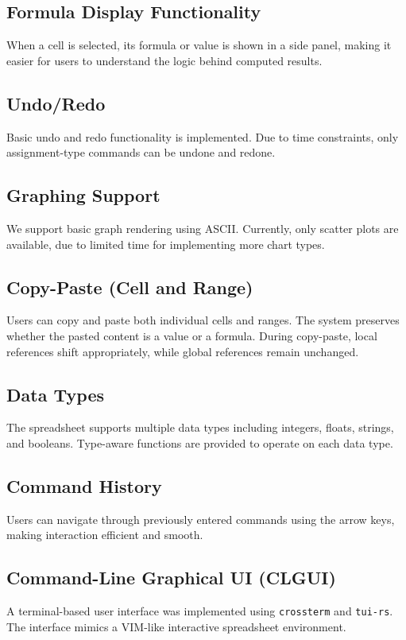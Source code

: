 \documentclass{article}
\begin{document}
\subsection{Formula Display Functionality}
When a cell is selected, its formula or value is shown in a side panel, making it easier for users to understand the logic behind computed results.

\subsection{Undo/Redo}
Basic undo and redo functionality is implemented. Due to time constraints, only assignment-type commands can be undone and redone.

\subsection{Graphing Support}
We support basic graph rendering using ASCII. Currently, only scatter plots are available, due to limited time for implementing more chart types.

\subsection{Copy-Paste (Cell and Range)}
Users can copy and paste both individual cells and ranges. The system preserves whether the pasted content is a value or a formula. During copy-paste, local references shift appropriately, while global references remain unchanged.

\subsection{Data Types}
The spreadsheet supports multiple data types including integers, floats, strings, and booleans. Type-aware functions are provided to operate on each data type.

\subsection{Command History}
Users can navigate through previously entered commands using the arrow keys, making interaction efficient and smooth.

\subsection{Command-Line Graphical UI (CLGUI)}
A terminal-based user interface was implemented using \texttt{crossterm} and \texttt{tui-rs}. The interface mimics a VIM-like interactive spreadsheet environment.
\end{document}
